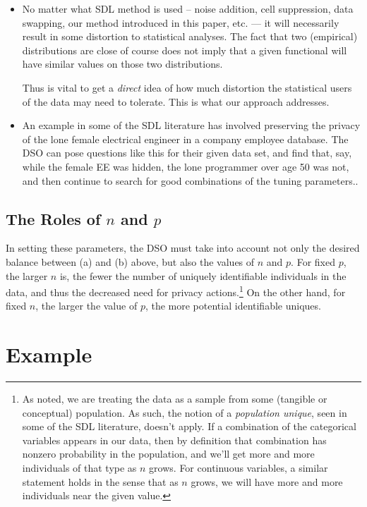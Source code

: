 \documentclass[11pt]{article}
\begin{document}
\begin{itemize}

\item No matter what SDL method is used -- noise addition, cell
suppression, data swapping, our method introduced in this paper, etc.
--- it will necessarily result in some distortion to statistical analyses.
The fact that two (empirical) distributions are close  of course does
not imply that a given functional will have similar values on those two
distributions.

Thus is vital to get a {\it direct} idea of how much distortion the
statistical users of the data may need to tolerate.  This is what our
approach addresses.

\item An example in some of the SDL literature has involved preserving
the privacy of the lone female electrical engineer in a company
employee database.  The DSO can pose questions like this for their given
data set, and find that, say,  while the female EE was hidden, the lone
programmer over age 50 was not, and then continue to search for good
combinations of the tuning parameters..

\end{itemize}

\subsection{The Roles of $n$ and $p$}

In setting these parameters, the DSO must take into account not only the
desired balance between (a) and (b) above, but also the values of $n$
and $p$.  For fixed $p$, the larger $n$ is, the fewer the number of
uniquely identifiable individuals in the data, and thus the decreased
need for privacy actions.\footnote{As noted, we are treating the data
as a sample from some (tangible or conceptual) population.  As such, the
notion of a {\it population unique}, seen in some of the SDL literature,
doesn't apply.  If a combination of the categorical variables appears in
our data, then by definition that combination has nonzero probability in
the population, and we'll get more and more individuals of that type as
$n$ grows.  For continuous variables, a similar statement holds in the
sense that as $n$ grows, we will have more and more individuals near the
given value.} On the other hand, for fixed $n$, the larger the value of
$p$, the more potential identifiable uniques.

\section{Example}
\end{document}
